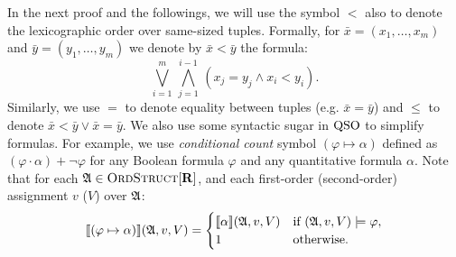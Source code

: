 In the next proof and the followings, we will use the symbol $<$ also to denote the lexicographic order over same-sized tuples. Formally, for $\bar{x} = (x_1,\ldots,x_m)$ and $\bar{y} = (y_1,\ldots,y_m)$ we denote by $\bar{x} < \bar{y}$ the formula:
$$
\bigvee_{i = 1}^m \, \bigwedge_{j = 1}^{i-1} \, (x_j = y_j \wedge x_i < y_i).
$$
Similarly, we use $=$ to denote equality between tuples (e.g. $\bar{x} = \bar{y}$) and $\leq$ to denote $\bar{x} < \bar{y} \vee \bar{x} = \bar{y}$.
We also use some syntactic sugar in ${\rm QSO}$ to simplify formulas. For example, we use {\em conditional count} symbol $(\varphi \mapsto \alpha)$ defined as $ (\varphi\cdot\alpha) + \neg\varphi$ for any Boolean formula $\varphi$ and any quantitative formula $\alpha$. Note that for each $\mathfrak{A} \in \text{\sc OrdStruct}[\mathbf{R}]$, and each first-order (second-order) assignment $v$ ($V$) over $\mathfrak{A}$:
\[
{\llbracket{}{(\varphi \mapsto \alpha)}\rrbracket}(\mathfrak{A},v,V) = 
\begin{cases}
{\llbracket{}{\alpha}\rrbracket}(\mathfrak{A},v,V) &\text{if } (\mathfrak{A},v,V)\models\varphi,\\
1 &\text{otherwise}.
\end{cases}
\]


